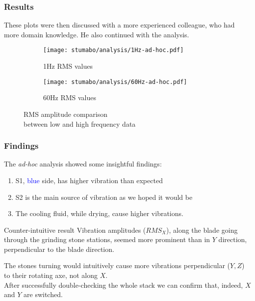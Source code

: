\begin{frame}
    \frametitle{Results}
    \vspace*{\fill}
    These plots were then discussed with a more experienced colleague, who had more domain knowledge.
    He also continued with the analysis.
    \begin{figure}[htp]
        \begin{subfigure}{.495\textwidth}
            \texttt{[image: stumabo/analysis/1Hz-ad-hoc.pdf]}
            \caption{1Hz RMS values}
            \label{fig:stu_1Hz_rms}
        \end{subfigure}
        \begin{subfigure}{.495\textwidth}
            \texttt{[image: stumabo/analysis/60Hz-ad-hoc.pdf]}
            \caption{60Hz RMS values}
            \label{fig:stu_60Hz_rms}
        \end{subfigure}
        \caption{RMS amplitude comparison \\between low and high frequency data}
        \label{fig:stu_3_rms}
    \end{figure}

    \vspace*{\fill}
\end{frame}

\begin{frame}
    \frametitle{Findings}
    \vspace*{\fill}

    The \textit{ad-hoc} analysis showed some insightful findings:
    \begin{enumerate}
        \item S1, \textcolor{blue}{blue} side, has higher vibration than expected
        \item S2 is the main source of vibration as we hoped it would be
        \item The cooling fluid, while drying, cause higher vibrations.
    \end{enumerate}

    \begin{alertblock}{Counter-intuitive result}
        Vibration amplitudes ($RMS_{X}$), along the blade going through the grinding stone stations, seemed \alert{more}
        prominent than in $Y$ direction, perpendicular to the blade direction.
    \end{alertblock}

    The stones turning would intuitively cause
    more vibrations perpendicular ($Y, Z$) to their rotating axe, not along $X$.\\
    After successfully double-checking the whole stack we can confirm that, indeed, $X$ and $Y$ are  switched.
    \vspace*{\fill}
\end{frame}
